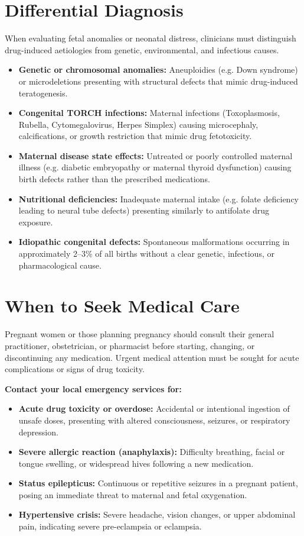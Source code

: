 \section*{Differential Diagnosis}
When evaluating fetal anomalies or neonatal distress, clinicians must distinguish drug-induced aetiologies from genetic, environmental, and infectious causes.
\begin{itemize}
    \item \textbf{Genetic or chromosomal anomalies:} Aneuploidies (e.g. Down syndrome) or microdeletions presenting with structural defects that mimic drug-induced teratogenesis.
    \item \textbf{Congenital TORCH infections:} Maternal infections (Toxoplasmosis, Rubella, Cytomegalovirus, Herpes Simplex) causing microcephaly, calcifications, or growth restriction that mimic drug fetotoxicity.
    \item \textbf{Maternal disease state effects:} Untreated or poorly controlled maternal illness (e.g. diabetic embryopathy or maternal thyroid dysfunction) causing birth defects rather than the prescribed medications.
    \item \textbf{Nutritional deficiencies:} Inadequate maternal intake (e.g. folate deficiency leading to neural tube defects) presenting similarly to antifolate drug exposure.
    \item \textbf{Idiopathic congenital defects:} Spontaneous malformations occurring in approximately 2--3\% of all births without a clear genetic, infectious, or pharmacological cause.
\end{itemize}

\section*{When to Seek Medical Care}
Pregnant women or those planning pregnancy should consult their general practitioner, obstetrician, or pharmacist before starting, changing, or discontinuing any medication. Urgent medical attention must be sought for acute complications or signs of drug toxicity.

\textbf{Contact your local emergency services for:}
\begin{itemize}
    \item \textbf{Acute drug toxicity or overdose:} Accidental or intentional ingestion of unsafe doses, presenting with altered consciousness, seizures, or respiratory depression.
    \item \textbf{Severe allergic reaction (anaphylaxis):} Difficulty breathing, facial or tongue swelling, or widespread hives following a new medication.
    \item \textbf{Status epilepticus:} Continuous or repetitive seizures in a pregnant patient, posing an immediate threat to maternal and fetal oxygenation.
    \item \textbf{Hypertensive crisis:} Severe headache, vision changes, or upper abdominal pain, indicating severe pre-eclampsia or eclampsia.
\end{itemize}

